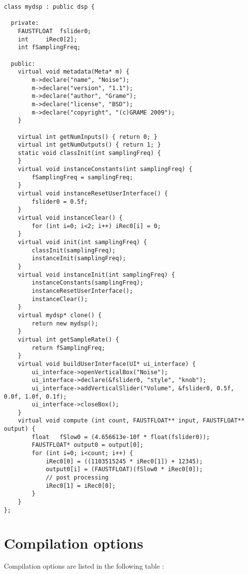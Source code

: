 \begin{lstlisting}[basicstyle=\ttfamily\footnotesize\color{yotxt}]
class mydsp : public dsp {

  private:
	FAUSTFLOAT 	fslider0;
	int 	iRec0[2];
	int fSamplingFreq;

  public:
	virtual void metadata(Meta* m) { 
		m->declare("name", "Noise");
		m->declare("version", "1.1");
		m->declare("author", "Grame");
		m->declare("license", "BSD");
		m->declare("copyright", "(c)GRAME 2009");
	}

	virtual int getNumInputs() { return 0; }
	virtual int getNumOutputs() { return 1; }
	static void classInit(int samplingFreq) {
	}
	virtual void instanceConstants(int samplingFreq) {
		fSamplingFreq = samplingFreq;
	}
	virtual void instanceResetUserInterface() {
		fslider0 = 0.5f;
	}
	virtual void instanceClear() {
		for (int i=0; i<2; i++) iRec0[i] = 0;
	}
	virtual void init(int samplingFreq) {
		classInit(samplingFreq);
		instanceInit(samplingFreq);
	}
	virtual void instanceInit(int samplingFreq) {
		instanceConstants(samplingFreq);
		instanceResetUserInterface();
		instanceClear();
	}
	virtual mydsp* clone() {
		return new mydsp();
	}
	virtual int getSampleRate() {
		return fSamplingFreq;
	}
	virtual void buildUserInterface(UI* ui_interface) {
		ui_interface->openVerticalBox("Noise");
		ui_interface->declare(&fslider0, "style", "knob");
		ui_interface->addVerticalSlider("Volume", &fslider0, 0.5f, 0.0f, 1.0f, 0.1f);
		ui_interface->closeBox();
	}
	virtual void compute (int count, FAUSTFLOAT** input, FAUSTFLOAT** output) {
		float 	fSlow0 = (4.656613e-10f * float(fslider0));
		FAUSTFLOAT* output0 = output[0];
		for (int i=0; i<count; i++) {
			iRec0[0] = ((1103515245 * iRec0[1]) + 12345);
			output0[i] = (FAUSTFLOAT)(fSlow0 * iRec0[0]);
			// post processing
			iRec0[1] = iRec0[0];
		}
	}
};
\end{lstlisting} 

\section{Compilation options}
Compilation options are listed in the following table :

\bigskip

\small

\tablelasttail{
  \hline
}


